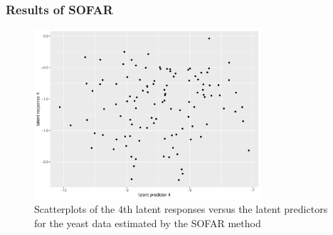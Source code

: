 \begin{frame} \frametitle{Results of SOFAR}
    \begin{figure}[h]
        \centering
        \includegraphics[width=0.75\textwidth]{./figs/latent4.pdf}
        \caption{Scatterplots of the $4$th latent responses versus the latent predictors for the yeast data estimated by the SOFAR method}
    \end{figure}
\end{frame}


